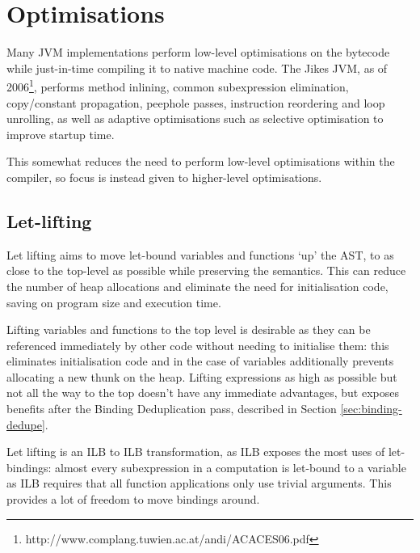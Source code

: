 \documentclass[dissertation.tex]{subfiles}
\begin{document}
\section{Optimisations}
{

    Many JVM implementations perform low-level optimisations on the bytecode while just-in-time compiling it to
    native machine code. The Jikes JVM, as of 2006\footnote{http://www.complang.tuwien.ac.at/andi/ACACES06.pdf},
    performs method inlining, common subexpression elimination, copy/constant propagation, peephole passes,
    instruction reordering and loop unrolling, as well as adaptive optimisations such as selective optimisation to
    improve startup time.

    This somewhat reduces the need to perform low-level optimisations within the compiler, so focus is instead given
    to higher-level optimisations.

    \subsection{Let-lifting}
    {

        Let lifting aims to move let-bound variables and functions `up' the AST, to as close to the top-level as
        possible while preserving the semantics. This can reduce the number of heap allocations and eliminate the
        need for initialisation code, saving on program size and execution time.

        
        Lifting variables and functions to the top level is desirable as they can be referenced immediately by other
        code without needing to initialise them: this eliminates initialisation code and in the case of variables
        additionally prevents allocating a new thunk on the heap. Lifting expressions as high as possible but not
        all the way to the top doesn't have any immediate advantages, but exposes benefits after the Binding
        Deduplication pass, described in Section \ref{sec:binding-dedupe}.

        Let lifting is an ILB to ILB transformation, as ILB exposes the most uses of let-bindings: almost every
        subexpression in a computation is let-bound to a variable as ILB requires that all function applications
        only use trivial arguments. This provides a lot of freedom to move bindings around.


}}
\end{document}
